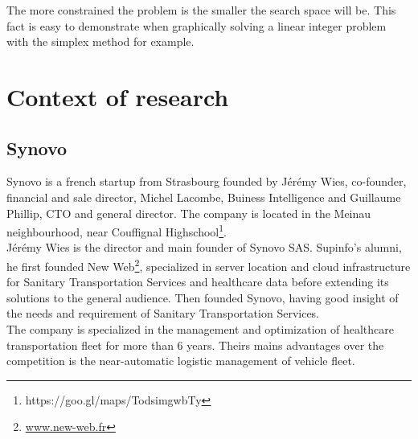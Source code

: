 \documentclass[12pt]{memoir}
\begin{document}
\bigskip
The more constrained the problem is the smaller the search space will be. This fact
is easy to demonstrate when graphically solving a linear integer problem with the
simplex\cite{nelder1965simplex} method for example.\\

\section{Context of research}
\subsection{Synovo} %

Synovo is a french startup from Strasbourg founded by Jérémy Wies, co-founder,
financial and sale director, Michel Lacombe, Buiness Intelligence and Guillaume
Phillip, CTO and general director. The company is located in the Meinau
neighbourhood, near Couffignal Highschool\footnote{https://goo.gl/maps/TodsimgwbTy}.\\
Jérémy Wies is the director and main founder of Synovo SAS. Supinfo's alumni, he
first founded New Web\footnote{\url{www.new-web.fr}}, specialized in server location
and cloud infrastructure for Sanitary Transportation Services and healthcare data
before extending its solutions to the general audience. Then founded Synovo, having good insight of the needs and requirement of Sanitary Transportation Services.\\
The company is specialized in the management and optimization of healthcare
transportation fleet for more than 6 years. Theirs mains advantages over the
competition is the near-automatic logistic management of vehicle fleet. 
\bigskip
\end{document}
